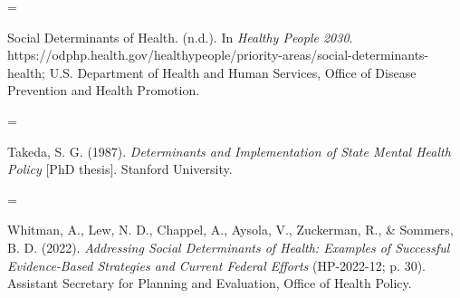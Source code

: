 \documentclass[10pt,twocolumn]{article}
\newlength{\cslhangindent}
\newenvironment{CSLReferences}[2] %
 {%
  \fontsize{9}{11}\selectfont  %
  \setlength{\parindent}{0pt}
  \ifodd #1
   \let\oldpar\par
   \def\par{\hangindent=\cslhangindent\oldpar}
  \fi
  \setlength{\parskip}{#2\baselineskip}
  \renewcommand{\bibitem}[2][]{\par}
 }%
 {}
\begin{document}
\begin{CSLReferences}{1}{0}
\bibitem[\citeproctext]{ref-SocialDeterminantsHealtha}
Social {Determinants} of {Health}. (n.d.). In \emph{Healthy People
2030}.
https://odphp.health.gov/healthypeople/priority-areas/social-determinants-health;
{U.S. Department of Health and Human Services, Office of Disease
Prevention and Health Promotion}.

\bibitem[\citeproctext]{ref-takedaDeterminantsImplementationState1987}
Takeda, S. G. (1987). \emph{Determinants and {Implementation} of {State
Mental Health Policy}} {[}PhD thesis{]}. Stanford University.

\bibitem[\citeproctext]{ref-whitmanAddressingSocialDeterminants}
Whitman, A., Lew, N. D., Chappel, A., Aysola, V., Zuckerman, R., \&
Sommers, B. D. (2022). \emph{Addressing {Social Determinants} of
{Health}: {Examples} of {Successful Evidence-Based Strategies} and
{Current Federal Efforts}} (HP-2022-12; p. 30). {Assistant Secretary for
Planning and Evaluation, Office of Health Policy}.

\end{CSLReferences}
\end{document}

